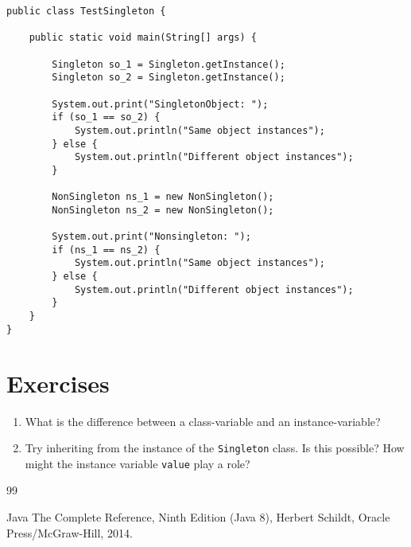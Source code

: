 \documentclass[12pt]{article}
\begin{document}
\begin{lstlisting}[label=JavaTESTSingleton,frame=lines,caption=Basic Singleton and Non-Singleton Test]
public class TestSingleton {
	
	public static void main(String[] args) {
		
		Singleton so_1 = Singleton.getInstance();
		Singleton so_2 = Singleton.getInstance();

		System.out.print("SingletonObject: ");
		if (so_1 == so_2) {
			System.out.println("Same object instances");
		} else {
			System.out.println("Different object instances");
		}
		
		NonSingleton ns_1 = new NonSingleton();
		NonSingleton ns_2 = new NonSingleton();
		
		System.out.print("Nonsingleton: ");
		if (ns_1 == ns_2) {
			System.out.println("Same object instances");
		} else {
			System.out.println("Different object instances");
		}
	}
}
\end{lstlisting}

%
%
\pagebreak
%
%

%
%
\section{Exercises}

%
%
%


\begin{enumerate}

\item
What is the difference between a class-variable and an instance-variable?

\item
Try inheriting from the instance of the \lstinline|Singleton| class.
Is this possible?
How might the instance variable \lstinline|value| play a role?



\end{enumerate}

%

%
%
%
\pagebreak
%
%

%
\begin {thebibliography}{99}
%
 
  Java The Complete Reference, Ninth Edition (Java 8),
	Herbert Schildt, Oracle Press/McGraw-Hill, 2014.


\end {thebibliography}
\end{document}
